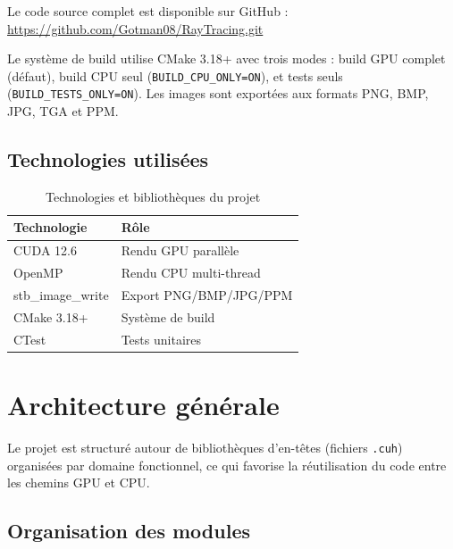 \documentclass[12pt,a4paper]{article}
\begin{document}
Le code source complet est disponible sur GitHub :
\url{https://github.com/Gotman08/RayTracing.git}

Le système de build utilise CMake 3.18+ avec trois modes : build GPU complet (défaut),
build CPU seul (\texttt{BUILD\_CPU\_ONLY=ON}), et tests seuls (\texttt{BUILD\_TESTS\_ONLY=ON}).
Les images sont exportées aux formats PNG, BMP, JPG, TGA et PPM.

\subsection{Technologies utilisées}

\begin{table}[H]
\centering
\begin{tabular}{ll}
\toprule
\textbf{Technologie} & \textbf{Rôle} \\
\midrule
CUDA 12.6           & Rendu GPU parallèle \\
OpenMP              & Rendu CPU multi-thread \\
stb\_image\_write   & Export PNG/BMP/JPG/PPM \\
CMake 3.18+         & Système de build \\
CTest               & Tests unitaires \\
\bottomrule
\end{tabular}
\caption{Technologies et bibliothèques du projet}
\end{table}

\section{Architecture générale}

Le projet est structuré autour de bibliothèques d'en-têtes (fichiers \texttt{.cuh}) organisées
par domaine fonctionnel, ce qui favorise la réutilisation du code entre les chemins GPU et CPU.

\subsection{Organisation des modules}
\end{document}
